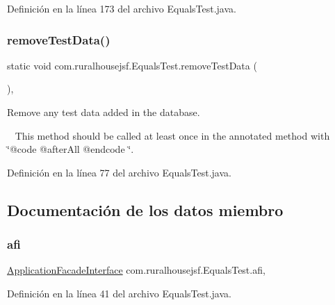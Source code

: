 Definición en la línea 173 del archivo Equals\+Test.\+java.

\mbox{\label{a00248_a74a69f394f6e76a2f557132edbc2ea00}} 
\subsubsection{\texorpdfstring{removeTestData()}{removeTestData()}}
{\footnotesize\ttfamily static void com.\+ruralhousejsf.\+Equals\+Test.\+remove\+Test\+Data (\begin{DoxyParamCaption}{ }\end{DoxyParamCaption})\hspace{0.3cm}{\ttfamily [static]}, {\ttfamily [private]}}



Remove any test data added in the database. 

~\newline
 This method should be called at least once in the annotated method with \char`\"{}@code @after\+All @endcode \char`\"{}. 

Definición en la línea 77 del archivo Equals\+Test.\+java.



\subsection{Documentación de los datos miembro}
\mbox{\label{a00248_a51e738cac64499dfd6d290d8f70ec8ce}} 
\subsubsection{\texorpdfstring{afi}{afi}}
{\footnotesize\ttfamily \mbox{\hyperlink{a00136}{Application\+Facade\+Interface}} com.\+ruralhousejsf.\+Equals\+Test.\+afi\hspace{0.3cm}{\ttfamily [static]}, {\ttfamily [package]}}



Definición en la línea 41 del archivo Equals\+Test.\+java.

\mbox{\label{a00248_a313faa108d9cc5b97c40bf50af089c87}} 
